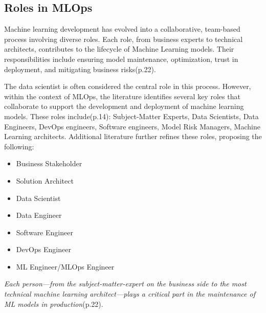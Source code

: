 \subsection{Roles in MLOps}\label{subsec:actors}

Machine learning development has evolved into a collaborative, team-based process involving diverse roles.
Each role, from business experts to technical architects, contributes to the lifecycle of Machine Learning models.
Their responsibilities include ensuring model maintenance, optimization, trust in deployment,
and mitigating business risks\cite{treveil2020introducing}(p.22).

The data scientist is often considered the central role in this process.
However, within the context of MLOps, the literature identifies several key roles that
collaborate to support the development and deployment of machine learning models.
These roles include\cite{treveil2020introducing}(p.14):
Subject-Matter Experts, Data Scientists, Data Engineers, DevOps engineers, Software engineers, Model Risk Managers, Machine Learning architects.
Additional literature further refines these roles, proposing the following\cite{Kreuzberger2022MachineLO}:

\begin{itemize}
    \item Business Stakeholder
    \item Solution Architect
    \item Data Scientist
    \item Data Engineer
    \item Software Engineer
    \item DevOps Engineer
    \item ML Engineer/MLOps Engineer
\end{itemize}

\textit{Each person—from the subject-matter-expert on the business side to the most
technical machine learning architect—plays a critical part in the maintenance of ML
models in production}\cite{treveil2020introducing}(p.22).

